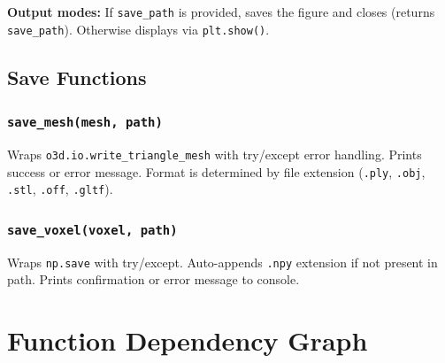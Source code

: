 \documentclass[12pt,a4paper]{article}
\begin{document}
\textbf{Output modes:} If \texttt{save\_path} is provided, saves the figure and closes (returns \texttt{save\_path}). Otherwise displays via \texttt{plt.show()}.

\subsection{Save Functions}

\subsubsection{\texttt{save\_mesh(mesh, path)}}

Wraps \texttt{o3d.io.write\_triangle\_mesh} with try/except error handling. Prints success or error message. Format is determined by file extension (\texttt{.ply}, \texttt{.obj}, \texttt{.stl}, \texttt{.off}, \texttt{.gltf}).

\subsubsection{\texttt{save\_voxel(voxel, path)}}

Wraps \texttt{np.save} with try/except. Auto-appends \texttt{.npy} extension if not present in path. Prints confirmation or error message to console.

\newpage

\section{Function Dependency Graph}
\end{document}
